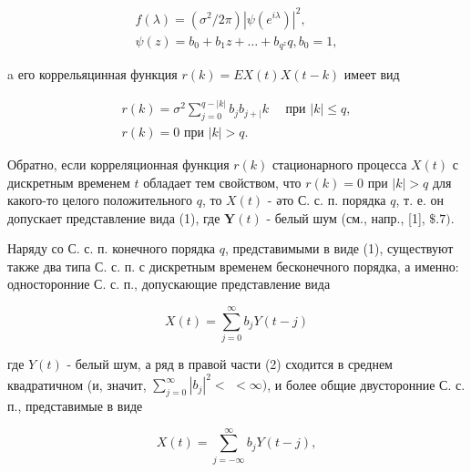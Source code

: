 \documentclass[10pt]{article}
\begin{document}
\[

\begin{gathered}

f(\lambda)=\left(\sigma^{2} / 2 \pi\right)\left|\psi\left(e^{i \lambda}\right)\right|^{2}, \\

\psi(z)=b_{0}+b_{1} z+\ldots+b_{q^{z}} q, b_{0}=1,

\end{gathered}

\]



a его коррельяцинная функция $r(k)=E X(t) X(t-k)$ имеет вид



\[

\begin{gathered}

r(k)=\sigma^{2} \sum_{j=0}^{q-|k|} b_{j} b_{j+\mid} k \quad \text { при }|k| \leqslant q, \\

r(k)=0 \text { при }|k|>q .

\end{gathered}

\]



Обратно, если корреляционная функция $r(k)$ стационарного процесса $X(t)$ с дискретным временем $t$ обладает тем свойством, что $r(k)=0$ при $|k|>q$ для какого-то целого положительного $q$, то $X(t)$ - әто С. с. п. порядка $q$, т. е. он допускает представление вида (1), где $\boldsymbol{Y}(t)$ - белый шум (см., напр., [1], $\$ .7)$.



Наряду со С. с. п. конечного порядка $q$, представимыми в виде (1), существуют также два типа С. с. п. с дискретным временем бесконечного порядка, а именно: односторонние С. с. п., допускающие представление вида



\[

X(t)=\sum_{j=0}^{\infty} b_{j} Y(t-j)

\]



где $Y(t)$ - белый шум, а ряд в правой части (2) сходится в среднем квадратичном (и, значит, $\sum_{j=0}^{\infty}\left|b_{j}\right|^{2}<$ $<\infty)$, и более общие двусторонние С. с. п., представимые в виде



\[

X(t)=\sum_{j=-\infty}^{\infty} b_{j} Y(t-j),

\]
\end{document}
